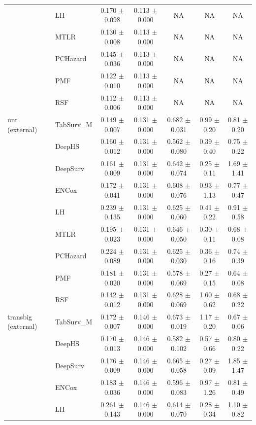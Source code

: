 \begin{longtable}{llccccc}
 & LH & 0.170 $\pm$ 0.098 & 0.113 $\pm$ 0.000 & NA & NA & NA \\
 & MTLR & 0.130 $\pm$ 0.008 & 0.113 $\pm$ 0.000 & NA & NA & NA \\
 & PCHazard & 0.145 $\pm$ 0.036 & 0.113 $\pm$ 0.000 & NA & NA & NA \\
 & PMF & 0.122 $\pm$ 0.010 & 0.113 $\pm$ 0.000 & NA & NA & NA \\
 & RSF & 0.112 $\pm$ 0.006 & 0.113 $\pm$ 0.000 & NA & NA & NA \\
\midrule
unt (external) & TabSurv\_M & 0.149 $\pm$ 0.007 & 0.131 $\pm$ 0.000 & 0.682 $\pm$ 0.031 & 0.99 $\pm$ 0.20 & 0.81 $\pm$ 0.20 \\
 & DeepHS & 0.160 $\pm$ 0.012 & 0.131 $\pm$ 0.000 & 0.562 $\pm$ 0.080 & 0.39 $\pm$ 0.40 & 0.75 $\pm$ 0.22 \\
 & DeepSurv & 0.161 $\pm$ 0.009 & 0.131 $\pm$ 0.000 & 0.642 $\pm$ 0.074 & 0.25 $\pm$ 0.11 & 1.69 $\pm$ 1.41 \\
 & ENCox & 0.172 $\pm$ 0.041 & 0.131 $\pm$ 0.000 & 0.608 $\pm$ 0.076 & 0.93 $\pm$ 1.13 & 0.77 $\pm$ 0.47 \\
 & LH & 0.239 $\pm$ 0.135 & 0.131 $\pm$ 0.000 & 0.625 $\pm$ 0.060 & 0.41 $\pm$ 0.22 & 0.91 $\pm$ 0.58 \\
 & MTLR & 0.195 $\pm$ 0.023 & 0.131 $\pm$ 0.000 & 0.646 $\pm$ 0.050 & 0.30 $\pm$ 0.11 & 0.68 $\pm$ 0.08 \\
 & PCHazard & 0.224 $\pm$ 0.089 & 0.131 $\pm$ 0.000 & 0.625 $\pm$ 0.030 & 0.36 $\pm$ 0.16 & 0.74 $\pm$ 0.39 \\
 & PMF & 0.181 $\pm$ 0.020 & 0.131 $\pm$ 0.000 & 0.578 $\pm$ 0.069 & 0.27 $\pm$ 0.15 & 0.64 $\pm$ 0.08 \\
 & RSF & 0.142 $\pm$ 0.012 & 0.131 $\pm$ 0.000 & 0.628 $\pm$ 0.069 & 1.60 $\pm$ 0.62 & 0.68 $\pm$ 0.22 \\
\midrule
transbig (external) & TabSurv\_M & 0.172 $\pm$ 0.007 & 0.146 $\pm$ 0.000 & 0.673 $\pm$ 0.019 & 1.17 $\pm$ 0.20 & 0.67 $\pm$ 0.06 \\
 & DeepHS & 0.170 $\pm$ 0.013 & 0.146 $\pm$ 0.000 & 0.582 $\pm$ 0.102 & 0.57 $\pm$ 0.66 & 0.80 $\pm$ 0.22 \\
 & DeepSurv & 0.176 $\pm$ 0.009 & 0.146 $\pm$ 0.000 & 0.665 $\pm$ 0.058 & 0.27 $\pm$ 0.09 & 1.85 $\pm$ 1.47 \\
 & ENCox & 0.183 $\pm$ 0.036 & 0.146 $\pm$ 0.000 & 0.596 $\pm$ 0.083 & 0.97 $\pm$ 1.26 & 0.81 $\pm$ 0.49 \\
 & LH & 0.261 $\pm$ 0.143 & 0.146 $\pm$ 0.000 & 0.614 $\pm$ 0.070 & 0.28 $\pm$ 0.34 & 1.10 $\pm$ 0.82 \\

\end{longtable}
